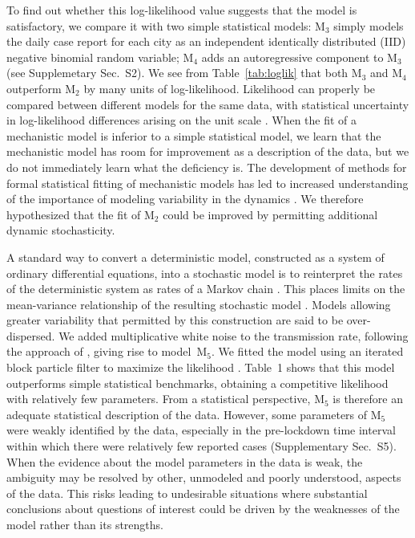 \documentclass[12pt]{article}\usepackage[]{graphicx}\usepackage[]{xcolor}
\newcommand\LiParams{M$_2$}
\newcommand\BenchmarkIID{M$_3$}
\newcommand\BenchmarkAR{M$_4$}
\newcommand\RevisedModelUnconstrained{M$_5$}
\newcommand\suppSecBenchmark{S2}
\newcommand\suppSecUnconstrained{S5} %
\begin{document}
To find out whether this log-likelihood value suggests that the model is satisfactory, we compare it with two simple statistical models:
{\BenchmarkIID} simply models the daily case report for each city as an independent identically distributed (IID) negative binomial random variable; 
{\BenchmarkAR} adds an autoregressive component to {\BenchmarkIID} (see Supplemetary Sec.~\suppSecBenchmark).
We see from Table~\ref{tab:loglik} that both {\BenchmarkIID} and {\BenchmarkAR} outperform {\LiParams} by many units of log-likelihood.
Likelihood can properly be compared between different models for the same data, with statistical uncertainty in log-likelihood differences arising on the unit scale \citep{pawitan01}.
When the fit of a mechanistic model is inferior to a simple statistical model, we learn that the mechanistic model has room for improvement as a description of the data, but we do not immediately learn what the deficiency is.
The development of methods for formal statistical fitting of mechanistic models has led to increased understanding of the importance of modeling variability in the dynamics \cite{he10,stocks20,whitehouse23}.
We therefore hypothesized that the fit of {\LiParams} could be improved by permitting additional dynamic stochasticity.

A standard way to convert a deterministic model, constructed as a system of ordinary differential equations, into a stochastic model is to reinterpret the rates of the deterministic system as rates of a Markov chain \citep{keeling09}.
This places limits on the mean-variance relationship of the resulting stochastic model \citep{breto11}.
Models allowing greater variability that permitted by this construction are said to be over-dispersed.
We added multiplicative white noise to the transmission rate, following the approach of \citep{breto09,he10}, giving rise to model~{\RevisedModelUnconstrained}.
We fitted the model using an iterated block particle filter to maximize the likelihood \citep{ionides22,ning23}.
Table~1 shows that this model outperforms simple statistical benchmarks, obtaining a competitive likelihood with relatively few parameters.
From a statistical perspective, {\RevisedModelUnconstrained} is therefore an adequate statistical description of the data.
However, some parameters of {\RevisedModelUnconstrained} were weakly identified by the data, especially in the pre-lockdown time interval within which there were relatively few reported cases (Supplementary Sec.~\suppSecUnconstrained).
When the evidence about the model parameters in the data is weak, the ambiguity may be resolved by other, unmodeled and poorly understood, aspects of the data.
This risks leading to undesirable situations where substantial conclusions about questions of interest could be driven by the weaknesses of the model rather than its strengths.
\end{document}
